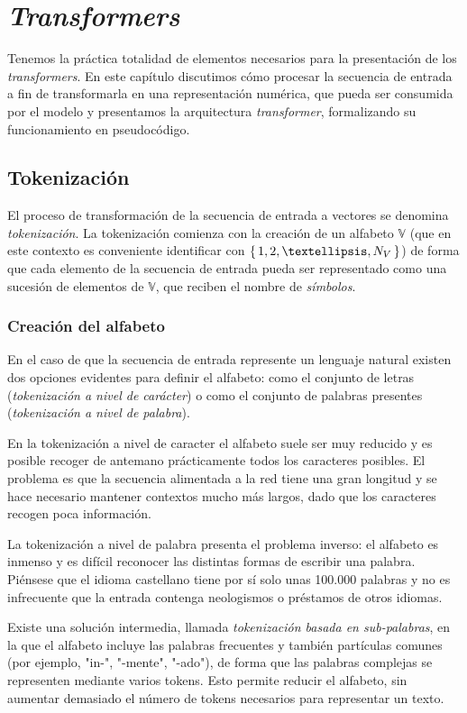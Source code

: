 \chapter{\textit{Transformers}}
Tenemos la práctica totalidad de elementos necesarios para la presentación de los \textit{transformers}. En este capítulo discutimos cómo procesar la secuencia de entrada a fin de transformarla en una representación numérica, que pueda ser consumida por el modelo y presentamos la arquitectura \textit{transformer}, formalizando su funcionamiento en pseudocódigo.

\section{Tokenización}
El proceso de transformación de la secuencia de entrada a vectores se denomina \textit{tokenización}. La tokenización comienza con la creación de un alfabeto \( \mathbb{V} \) (que en este contexto es conveniente identificar con \( \Set{ 1, 2, …, N_V } \)) de forma que cada elemento de la secuencia de entrada pueda ser representado como una sucesión de elementos de \( \mathbb{V} \), que reciben el nombre de \textit{símbolos}.

\subsection{Creación del alfabeto}
En el caso de que la secuencia de entrada represente un lenguaje natural existen dos opciones evidentes para definir el alfabeto: como el conjunto de letras (\textit{tokenización a nivel de carácter}) o como el conjunto de palabras presentes (\textit{tokenización a nivel de palabra}).

En la tokenización a nivel de caracter el alfabeto suele ser muy reducido y es posible recoger de antemano prácticamente todos los caracteres posibles. El problema es que la secuencia alimentada a la red tiene una gran longitud y se hace necesario mantener contextos mucho más largos, dado que los caracteres recogen poca información.

La tokenización a nivel de palabra presenta el problema inverso: el alfabeto es inmenso y es difícil reconocer las distintas formas de escribir una palabra. Piénsese que el idioma castellano tiene por sí solo unas 100.000 palabras y no es infrecuente que la entrada contenga neologismos o préstamos de otros idiomas.

Existe una solución intermedia, llamada \textit{tokenización basada en sub-palabras}, en la que el alfabeto incluye las palabras frecuentes y también partículas comunes (por ejemplo, "in-", "-mente", "-ado"), de forma que las palabras complejas se representen mediante varios tokens. Esto permite reducir el alfabeto, sin aumentar demasiado el número de tokens necesarios para representar un texto.

